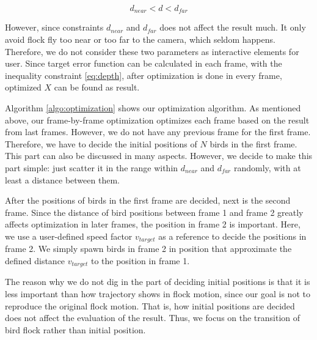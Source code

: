 \begin{equation}\label{eq:depth}
d_{near} < d < d_{far}
\end{equation}


However, since constraints $d_{near}$ and $d_{far}$ does not affect the result much. It only avoid flock fly too near or too far to the camera, which seldom happens. Therefore, we do not consider these two parameters as interactive elements for user. Since target error function can be calculated in each frame, with the inequality constraint \ref{eq:depth}, after optimization is done in every frame, optimized $X$ can be found as result.


Algorithm \ref{algo:optimization}  shows our optimization algorithm. As mentioned above, our frame-by-frame optimization optimizes each frame based on the result from last frames. However, we do not have any previous frame for the first frame. Therefore, we have to decide the initial positions of $N$ birds in the first frame. This part can also be discussed in many aspects. However, we decide to make this part simple: just scatter it in the range within $d_{near}$ and $d_{far}$ randomly, with at least a distance between them.


After the positions of birds in the first frame are decided, next is the second frame. Since the distance of bird positions between frame 1 and frame 2 greatly affects optimization in later frames, the position in frame 2 is important. Here, we use a user-defined speed factor $v_{target}$ as a reference to decide the positions in frame 2. We simply spawn birds in frame 2 in position that approximate the defined distance $v_{target}$ to the position in frame 1.


The reason why we do not dig in the part of deciding initial positions is that it is less important than how trajectory shows in flock motion, since our goal is not to reproduce the original flock motion. That is, how initial positions are decided does not affect the evaluation of the result. Thus, we focus on the transition of bird flock rather than initial position. 


